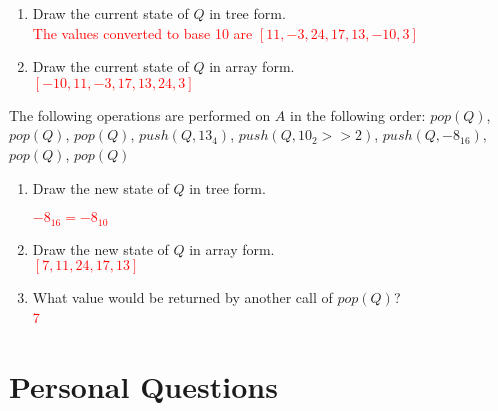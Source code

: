 \documentclass[11pt,addpoints]{exam}
\begin{document}
\begin{questions}
\newpage


\begin{enumerate}[label=(\Alph*)]
  \item Draw the current state of $Q$ in tree form. \\

    \textcolor{red}{The values converted to base 10 are $[11, -3, 24, 17, 13, -10, 3]$} \\

    

  \item Draw the current state of $Q$ in array form. \\

  \textcolor{red}{$[-10, 11, -3, 17, 13, 24, 3]$} \\

\end{enumerate}

The following operations are performed on $A$ in the following order: $pop(Q)$, $pop(Q)$, $pop(Q)$, $push(Q, 13_{4})$,
$push(Q, 10_{2} >> 2)$, $push(Q, -8_{16})$, $pop(Q)$, $pop(Q)$ \\

\begin{enumerate}[resume,label=(\Alph*)]
  \item Draw the new state of $Q$ in tree form.

  \textcolor{red}{$-8_{16} = -8_{10}$}

  

  \item Draw the new state of $Q$ in array form. \\

  \textcolor{red}{$[7, 11, 24, 17, 13]$} \\

  \item What value would be returned by another call of $pop(Q)$? \\

  \textcolor{red}{7}

\end{enumerate}

\newpage


\section{Personal Questions}


\end{questions}
\end{document}
